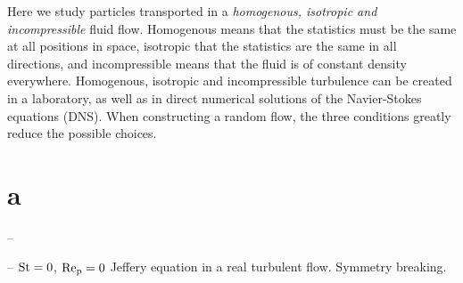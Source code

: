 \documentclass[thesis.tex]{subfiles}
\begin{document}
Here we study particles transported in a \emph{homogenous, isotropic and incompressible} fluid flow. Homogenous means that the statistics must be the same at all positions in space, isotropic that the statistics are the same in all directions, and incompressible means that the fluid is of constant density everywhere. Homogenous, isotropic and incompressible turbulence can be created in a laboratory, as well as in direct numerical solutions of the Navier-Stokes equations (DNS). 
When constructing a random flow, the three conditions greatly reduce the possible choices.



\section{a}



-- 

-- $\mbox{St}=0$, $\mbox{Re}_{\mathrm p}=0$ Jeffery equation in a real turbulent flow. Symmetry breaking.
\end{document}
